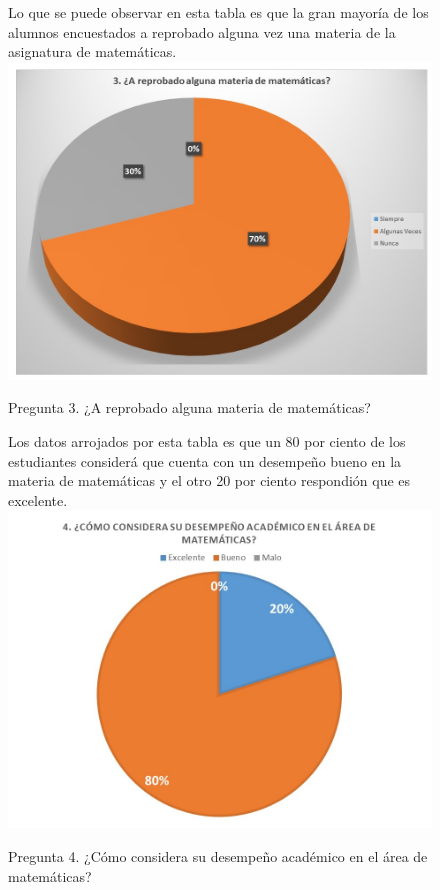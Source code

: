 \documentclass[12pt] {report}
\begin{document}
\begin{figure}[H]
\centering
Lo que se puede observar en esta tabla es que la gran mayoría de los alumnos encuestados a reprobado alguna vez una materia de la asignatura de matemáticas.
\includegraphics[scale=.7]{pregunta3.JPG}
\caption{Pregunta 3. ¿A reprobado alguna materia de matemáticas?}
\end{figure}
\begin{figure}[H]
\centering
Los datos arrojados por esta tabla es que un 80 por ciento de los estudiantes considerá que cuenta con un desempeño bueno en la materia de matemáticas y el otro 20 por ciento respondión que es excelente.
\includegraphics[scale=.7]{pregunta4.JPG}
\caption{Pregunta 4. ¿Cómo considera su desempeño académico en el área de matemáticas?}
\end{figure}
\end{document}
